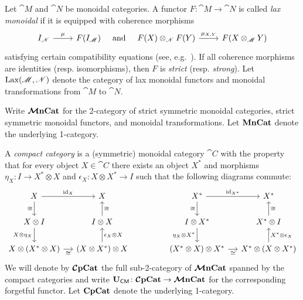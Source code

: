 \documentclass[11pt,oneside,article]{memoir}
\begin{document}
Let $\cat{M}$ and $\cat{N}$ be monoidal categories. A functor $F\colon\cat{M}\to\cat{N}$ is called \emph{lax monoidal} if it is equipped with coherence morphisms
\begin{equation*} \begin{tikzcd}
      I_{\cat{N}} \rar{\mu} & F(I_{\cat{M}})
\end{tikzcd}
\quad\text{and}\quad 
\begin{tikzcd}
      F(X) \otimes_{\cat{N}} F(Y) \rar{\mu_{X,Y}} & F(X\otimes_{\cat{M}} Y)
\end{tikzcd} \end{equation*}
satisfying certain compatibility equations (see, e.g.\ \cite{Leinster,BorceuxV2}). If all coherence morphisms are identities (resp. isomorphisms), then $F$ is \emph{strict} (resp. \emph{strong}). Let $\operatorname{Lax}(\mathscr{M},\mathscr{N})$ denote the category of lax monoidal functors and monoidal transformations from $\cat{M}$ to $\cat{N}$.

Write $\bm{\mathcal{M}}\mathbf{nCat}$ for the 2-category of strict symmetric monoidal categories, strict symmetric
monoidal functors, and monoidal transformations. Let $\mathbf{MnCat}$ denote the underlying 1-category.

A \emph{compact category} is a (symmetric) monoidal category $\cat{C}$ with the property that for every
object $X\in\cat{C}$ there exists an object $X^*$ and morphisms $\eta_X\colon I\to X^*\otimes X$ and
$\epsilon_X\colon X\otimes X^*\to I$ such that the following diagrams commute:
\begin{equation*}
   \begin{tikzcd}[column sep=small]
      X\arrow[r,"\id_X"]\arrow[d,"\cong"'] & X \\
      X\otimes I\arrow[d,"X\otimes\eta_X"'] & I\otimes X\arrow[u,"\cong"'] \\
      X\otimes(X^*\otimes X)\arrow[r,"\cong"'] & (X\otimes X^*)\otimes X\arrow[u,"\epsilon_X\otimes X"']
   \end{tikzcd}
   \hspace{.6in}
   \begin{tikzcd}[column sep=small]
      X^*\arrow[r,"\id_{X^*}"]\arrow[d,"\cong"'] & X^*\\
      I\otimes X^*\arrow[d,"\eta_X\otimes X^*"'] & X^*\otimes I\arrow[u,"\cong"'] \\
      (X^*\otimes X)\otimes X^*\arrow[r,"\cong"'] & X^*\otimes (X\otimes X^*)\arrow[u,"X^*\otimes\epsilon_X"']
   \end{tikzcd}
\end{equation*}
We will denote by $\bm{\mathcal{C}}\mathbf{pCat}$ the full sub-2-category of $\bm{\mathcal{M}}\mathbf{nCat}$ spanned by the compact categories and write $\mathbf{U}_{\mathsf{CM}}\colon\bm{\mathcal{C}}\mathbf{pCat}\to\bm{\mathcal{M}}\mathbf{nCat}$ for the corresponding forgetful functor. Let $\mathbf{CpCat}$ denote the underlying 1-category.
\end{document}
